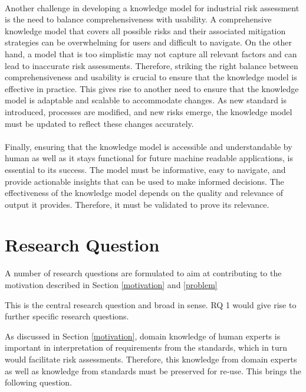 \paragraph{} Another challenge in developing a knowledge model for industrial risk assessment is the need to balance comprehensiveness with usability. A comprehensive knowledge model that covers all possible risks and their associated mitigation strategies can be overwhelming for users and difficult to navigate. On the other hand, a model that is too simplistic may not capture all relevant factors and can lead to inaccurate risk assessments. Therefore, striking the right balance between comprehensiveness and usability is crucial to ensure that the knowledge model is effective in practice. This gives rise to another need to ensure that the knowledge model is adaptable and scalable to accommodate changes. As new standard is introduced, processes are modified, and new risks emerge, the knowledge model must be updated to reflect these changes accurately. 

\paragraph{} Finally, ensuring that the knowledge model is accessible and understandable by human as well as it stays functional for future machine readable applications, is essential to its success. The model must be informative, easy to navigate, and provide actionable insights that can be used to make informed decisions. The effectiveness of the knowledge model depends on the quality and relevance of output it provides. Therefore, it must be validated to prove its relevance. 

\section{Research Question} \label{rq}

A number of research questions are formulated to aim at contributing to the motivation described in Section \ref{motivation} and \ref{problem}


This is the central research question and broad in sense. RQ 1 would give rise to further specific research questions. 

As discussed in Section \ref{motivation}, domain knowledge of human experts is important in interpretation of requirements from the standards, which in turn would facilitate risk assessments. Therefore, this knowledge from domain experts as well as knowledge from standards must be preserved for re-use. This brings the following question.

